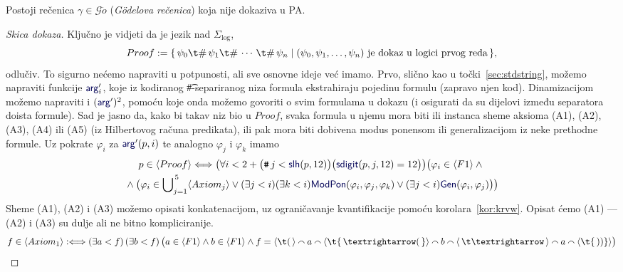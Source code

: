 \begin{teorem}[{name=[Gödelov prvi teorem nepotpunosti]}]\label{tm:goedel}
Postoji rečenica $\gamma\in\mathscr G\ddot o$ (\emph{Gödelova rečenica}) koja nije dokaziva u PA\@.
\end{teorem}
\begin{proof}[Skica dokaza]
Ključno je vidjeti da je jezik nad $\Sigma_{\log}$,
\begin{equation}
    Proof:=\{\,\psi_0\t\#\,\psi_1\t\#\,\dotsb\,\t\#\,\psi_n\mid (\psi_0,\psi_1,\dots,\psi_n)\text{ je dokaz u logici prvog reda}\,\}\text,
\end{equation}
	odlučiv\!. To sigurno nećemo napraviti u potpunosti, ali sve osnovne ideje već imamo. Prvo, slično kao u točki~\ref{sec:stdstring}, možemo napraviti funkcije $\f{arg}'_i$, koje iz kodiranog \t\#-separiranog niza formula ekstrahiraju pojedinu formulu (zapravo njen kod). Dinamizacijom možemo napraviti i $(\f{arg}')^2$, pomoću koje onda možemo govoriti o svim formulama u dokazu (i osigurati da su dijelovi između separatora doista formule). Sad je jasno da, kako bi takav niz bio u $Proof$, svaka formula u njemu mora biti ili instanca sheme aksioma (A1), (A2), (A3), (A4) ili (A5) (iz Hilbertovog računa predikata), ili pak mora biti dobivena modus ponensom ili generalizacijom iz neke prethodne formule. Uz pokrate $\varphi_i$ za $\f{arg}'(p,i)$ te analogno $\varphi_j$ i $\varphi_k$ imamo
\begin{multline*}
	p\in\langle Proof\rangle\Longleftrightarrow\bigl(\forall i<2+\bigl(\num j<\f{slh}(p,12)\bigr)\bigl(\f{sdigit}(p,j,12)=12\bigr)\bigr)\bigl(\varphi_i\in\kr{F1}\land{}\\{}\land\bigl(
	\varphi_i\in\bigcup\nolimits_{j=1}^{\,5}\kr{Axiom_j}\lor(\exists j<i)(\exists k<i)\f{ModPon}(\varphi_i,\varphi_j,\varphi_k)\lor(\exists j<i)\f{Gen}(\varphi_i,\varphi_j)\bigr)\bigr)
\end{multline*}
	Sheme (A1), (A2) i (A3) možemo opisati konkatenacijom, uz ograničavanje kvantifikacije pomoću korolara~\ref{kor:krvw}. Opisat ćemo (A1) --- (A2) i (A3) su dulje ali ne bitno kompliciranije.
\begin{equation*}
	f\in\kr{Axiom_1}:\Longleftrightarrow(\exists a<f)\,(\exists b<f)\,\bigl(a\in\kr{F1}\land b\in\kr{F1}\land f=\langle\t(\,\rangle\conc{}a\conc{}\langle\t{\,\textrightarrow(\,}\rangle\conc{}b\conc{}\langle\,\t\textrightarrow\,\rangle\conc{}a\conc{}\langle\t{\,))}\rangle\bigr)
\end{equation*}


\end{proof}

